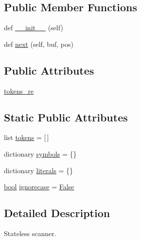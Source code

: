 \subsection*{Public Member Functions}
\begin{DoxyCompactItemize}
\item 
def \hyperlink{classsmacc__viewer_1_1xdot_1_1xdot_1_1Scanner_a5bffb8d13c4b249cc3bf450bc1aef8ce}{\+\_\+\+\_\+init\+\_\+\+\_\+} (self)
\item 
def \hyperlink{classsmacc__viewer_1_1xdot_1_1xdot_1_1Scanner_aba0c6db4df841feb6e42ffa0b6ab2d65}{next} (self, buf, pos)
\end{DoxyCompactItemize}
\subsection*{Public Attributes}
\begin{DoxyCompactItemize}
\item 
\hyperlink{classsmacc__viewer_1_1xdot_1_1xdot_1_1Scanner_a14859d0283cb278fc3526eb313a1c4b3}{tokens\+\_\+re}
\end{DoxyCompactItemize}
\subsection*{Static Public Attributes}
\begin{DoxyCompactItemize}
\item 
list \hyperlink{classsmacc__viewer_1_1xdot_1_1xdot_1_1Scanner_a9c1c5b5b90c3d4282b56edf396a822b3}{tokens} = \mbox{[}$\,$\mbox{]}
\item 
dictionary \hyperlink{classsmacc__viewer_1_1xdot_1_1xdot_1_1Scanner_a1e1208f35dbfc3ad5c2c6a28b99cde53}{symbols} = \{\}
\item 
dictionary \hyperlink{classsmacc__viewer_1_1xdot_1_1xdot_1_1Scanner_ae37f61b9c99b0d7ab8195b52c859e254}{literals} = \{\}
\item 
\hyperlink{classbool}{bool} \hyperlink{classsmacc__viewer_1_1xdot_1_1xdot_1_1Scanner_a0c0357df655e8db8794746b713c24173}{ignorecase} = \hyperlink{namespacesmacc__viewer_a5928e8da279785cbab9011356c3eaa87}{False}
\end{DoxyCompactItemize}


\subsection{Detailed Description}
\begin{DoxyVerb}Stateless scanner.\end{DoxyVerb}
 

